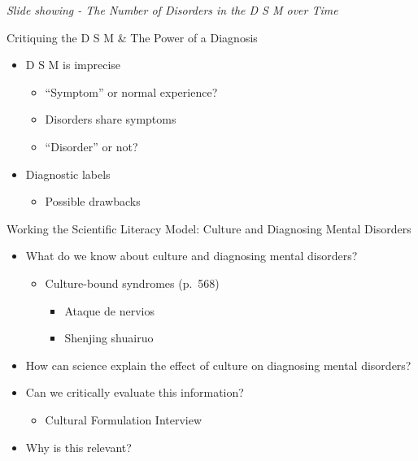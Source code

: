 \documentclass[
]{book}
\providecommand{\tightlist}{%
  \setlength{\itemsep}{0pt}\setlength{\parskip}{0pt}}
\begin{document}
\begin{reflect}
\emph{Slide showing - The Number of Disorders in the D S M over Time }

Critiquing the D S M \& The Power of a Diagnosis

\begin{itemize}
\tightlist
\item
  D S M is imprecise

  \begin{itemize}
  \tightlist
  \item
    ``Symptom'' or normal experience?\\
  \item
    Disorders share symptoms\\
  \item
    ``Disorder'' or not?\\
  \end{itemize}
\item
  Diagnostic labels

  \begin{itemize}
  \tightlist
  \item
    Possible drawbacks
  \end{itemize}
\end{itemize}

Working the Scientific Literacy Model: Culture and Diagnosing Mental Disorders

\begin{itemize}
\tightlist
\item
  What do we know about culture and diagnosing mental disorders?

  \begin{itemize}
  \tightlist
  \item
    Culture-bound syndromes (p.~568)

    \begin{itemize}
    \tightlist
    \item
      Ataque de nervios\\
    \item
      Shenjing shuairuo\\
    \end{itemize}
  \end{itemize}
\item
  How can science explain the effect of culture on diagnosing mental disorders?\\
\item
  Can we critically evaluate this information?

  \begin{itemize}
  \tightlist
  \item
    Cultural Formulation Interview\\
  \end{itemize}
\item
  Why is this relevant?


\end{itemize}
\end{reflect}
\end{document}
